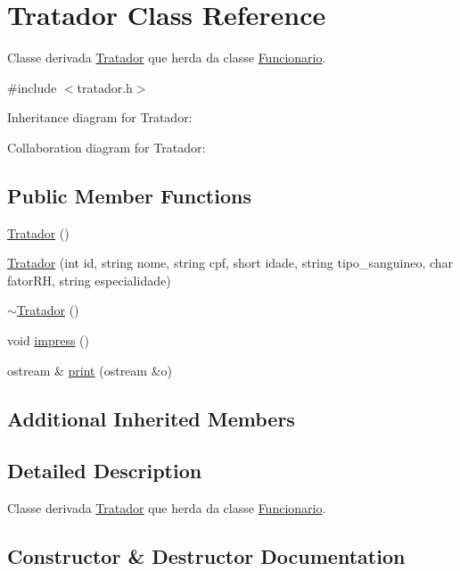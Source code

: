 \hypertarget{classTratador}{}\section{Tratador Class Reference}
\label{classTratador}


Classe derivada \hyperlink{classTratador}{Tratador} que herda da classe \hyperlink{classFuncionario}{Funcionario}.  




{\ttfamily \#include $<$tratador.\+h$>$}



Inheritance diagram for Tratador\+:


Collaboration diagram for Tratador\+:
\subsection*{Public Member Functions}
\begin{DoxyCompactItemize}
\item 
\hyperlink{classTratador_a4339bfc1e32968609401440338eeba20}{Tratador} ()
\item 
\hyperlink{classTratador_a5f25dd6ac50c9635f9ce67f01914393a}{Tratador} (int id, string nome, string cpf, short idade, string tipo\+\_\+sanguineo, char fator\+RH, string especialidade)
\item 
\hyperlink{classTratador_a8750ed6960e786da5d6f87e05b491093}{$\sim$\+Tratador} ()
\item 
void \hyperlink{classTratador_ac7651dbd65916ae7a37251314fd06797}{impress} ()
\item 
ostream \& \hyperlink{classTratador_ac421665ebd5c8661c8a971d8dd1d426b}{print} (ostream \&o)
\end{DoxyCompactItemize}
\subsection*{Additional Inherited Members}


\subsection{Detailed Description}
Classe derivada \hyperlink{classTratador}{Tratador} que herda da classe \hyperlink{classFuncionario}{Funcionario}. 

\subsection{Constructor \& Destructor Documentation}
